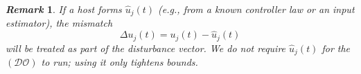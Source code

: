 \documentclass{ifacconf}
\def\V{\mathcal{V}} %
\def\N{\mathcal{N}} %
\def\LO{\mathcal{LO}} %
\def\DO{\mathcal{DO}} %
\newtheorem{remark}{\it \textbf{Remark}}%
\begin{document}

\begin{remark}\label{rem1}
If a host forms $\hat{u}_j(t)$ (e.g., from a known controller law or an input estimator), the mismatch 
\begin{equation}
    \Delta u_j(t) = u_j(t) - \hat{u}_j(t)
\end{equation}
will be treated as part of the disturbance vector. %
We do not require $\hat{u}_j(t)$ for the $(\DO)$ to run; using it only tightens bounds.
\end{remark}




\end{document}
